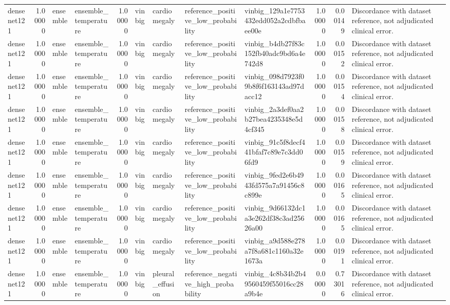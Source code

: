 \begin{tabular}{lrllrllllrrl}
densenet121 & 1.00000 & ensemble & ensemble\_temperature & 1.00000 & vinbig & cardiomegaly & reference\_positive\_low\_probability & vinbig\_129a1e7753432edd052a2cdbfbaee00e & 1.00000 & 0.00149 & Discordance with dataset reference, not adjudicated clinical error. \\
densenet121 & 1.00000 & ensemble & ensemble\_temperature & 1.00000 & vinbig & cardiomegaly & reference\_positive\_low\_probability & vinbig\_b4db27f83c152fb40adc9bd6a4e742d8 & 1.00000 & 0.00152 & Discordance with dataset reference, not adjudicated clinical error. \\
densenet121 & 1.00000 & ensemble & ensemble\_temperature & 1.00000 & vinbig & cardiomegaly & reference\_positive\_low\_probability & vinbig\_098d7923f09b8f6f163143ad97dacc12 & 1.00000 & 0.00154 & Discordance with dataset reference, not adjudicated clinical error. \\
densenet121 & 1.00000 & ensemble & ensemble\_temperature & 1.00000 & vinbig & cardiomegaly & reference\_positive\_low\_probability & vinbig\_2a3def0aa2b27bea4235348e5d4cf345 & 1.00000 & 0.00158 & Discordance with dataset reference, not adjudicated clinical error. \\
densenet121 & 1.00000 & ensemble & ensemble\_temperature & 1.00000 & vinbig & cardiomegaly & reference\_positive\_low\_probability & vinbig\_91c5f8decf441bfaf7c89e7c3dd06fd9 & 1.00000 & 0.00159 & Discordance with dataset reference, not adjudicated clinical error. \\
densenet121 & 1.00000 & ensemble & ensemble\_temperature & 1.00000 & vinbig & cardiomegaly & reference\_positive\_low\_probability & vinbig\_9fed2e6b4943fd575a7a91456c8c899e & 1.00000 & 0.00165 & Discordance with dataset reference, not adjudicated clinical error. \\
densenet121 & 1.00000 & ensemble & ensemble\_temperature & 1.00000 & vinbig & cardiomegaly & reference\_positive\_low\_probability & vinbig\_9d66132dc1a3e262df38c3ad25626a00 & 1.00000 & 0.00165 & Discordance with dataset reference, not adjudicated clinical error. \\
densenet121 & 1.00000 & ensemble & ensemble\_temperature & 1.00000 & vinbig & cardiomegaly & reference\_positive\_low\_probability & vinbig\_a9d588e278a7f8a681c1160a32e1673a & 1.00000 & 0.00191 & Discordance with dataset reference, not adjudicated clinical error. \\
densenet121 & 1.00000 & ensemble & ensemble\_temperature & 1.00000 & vinbig & pleural\_effusion & reference\_negative\_high\_probability & vinbig\_4c8b34b2b49560459f55016cc28a9b4e & 0.00000 & 0.73016 & Discordance with dataset reference, not adjudicated clinical error. \\

\end{tabular}
